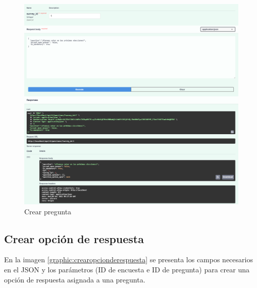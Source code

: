 \begin{figure}[!htb]
    \centering
    \includegraphics[scale=.3]{TT/img/pruebas/test_crear_pregunta.png}
    \caption{Crear pregunta}
    \label{graphic:crearpregunta}
\end{figure}

\subsection{Crear opción de respuesta}
En la imagen \ref{graphic:crearopcionderespuesta} se presenta los campos necesarios en el JSON y los parámetros (ID de encuesta e ID de pregunta) para crear una opción de respuesta asignada a una pregunta. 

